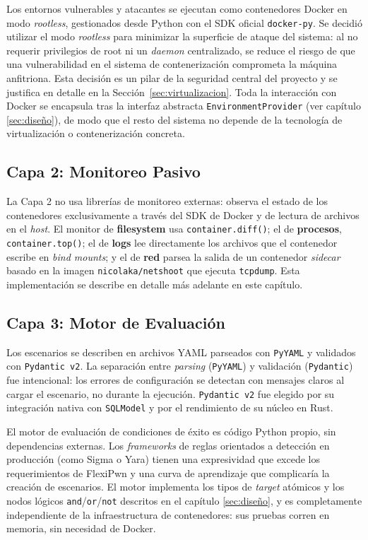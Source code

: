 Los entornos vulnerables y atacantes se ejecutan como contenedores Docker en
modo \textit{rootless}, gestionados desde Python con el SDK oficial
\texttt{docker-py}. Se decidió utilizar el modo \textit{rootless} para minimizar
la superficie de ataque del sistema: al no requerir privilegios de root ni un
\textit{daemon} centralizado, se reduce el riesgo de que una vulnerabilidad en
el sistema de contenerización comprometa la máquina anfitriona. Esta decisión es
un pilar de la seguridad central del proyecto y se justifica en detalle en la
Sección~\ref{sec:virtualizacion}. Toda la interacción con Docker se encapsula
tras la interfaz abstracta \texttt{EnvironmentProvider} (ver capítulo
\ref{sec:diseño}), de modo que el resto del sistema no depende de la tecnología
de virtualización o contenerización concreta.

\subsection{Capa 2: Monitoreo Pasivo}

La Capa 2 no usa librerías de monitoreo externas: observa el estado de los
contenedores exclusivamente a través del SDK de Docker y de lectura de archivos
en el \textit{host}. El monitor de \textbf{filesystem} usa
\texttt{container.diff()}; el de \textbf{procesos}, \texttt{container.top()}; el
de \textbf{logs} lee directamente los archivos que el contenedor escribe en
\textit{bind mounts}; y
el de \textbf{red} parsea la salida de un contenedor \textit{sidecar} basado en
la imagen \texttt{nicolaka/netshoot} que ejecuta \texttt{tcpdump}. Esta
implementación se describe en detalle más adelante en este capítulo.

\subsection{Capa 3: Motor de Evaluación}

Los escenarios se describen en archivos YAML parseados con \texttt{PyYAML} y
validados con \texttt{Pydantic v2}. La separación entre \textit{parsing}
(\texttt{PyYAML}) y validación (\texttt{Pydantic}) fue intencional: los errores
de configuración se detectan con mensajes claros al cargar el escenario, no
durante la ejecución. \texttt{Pydantic v2} fue elegido por su integración nativa
con \texttt{SQLModel} y por el rendimiento de su núcleo en Rust.

El motor de evaluación de condiciones de éxito es código Python propio, sin
dependencias externas. Los \textit{frameworks} de reglas orientados a detección
en producción (como Sigma o Yara) tienen una expresividad que excede los
requerimientos de FlexiPwn y una curva de aprendizaje que complicaría la
creación de escenarios. El motor implementa los tipos de \textit{target}
atómicos y los nodos lógicos \texttt{and}/\texttt{or}/\texttt{not} descritos en
el capítulo \ref{sec:diseño}, y es completamente independiente de la
infraestructura de contenedores: sus pruebas corren en memoria, sin necesidad de
Docker.


